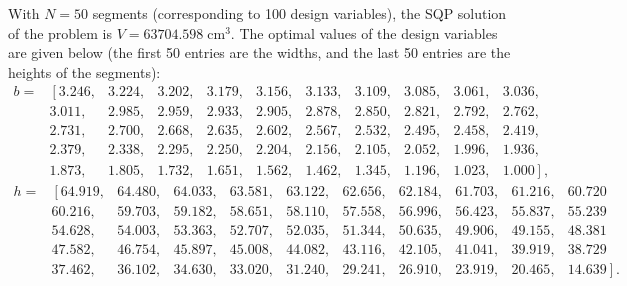 \documentclass[a4paper]{llncs}
\begin{document}
With $N=50$ segments (corresponding to 100 design variables), the SQP solution
of the problem is $V = 63704.598\;\text{cm}^3$. The optimal values of the
design variables are given below (the first 50 entries are the widths, and the
last 50 entries are the heights of the segments):
\setcounter{MaxMatrixCols}{11}
\[
\begin{matrix}%
			b=& \left[3.246, \right.& 3.224,& 3.202,& 3.179,& 3.156,& 3.133,& 3.109,& 3.085,& 3.061,& 3.036,  \\
			  & 3.011,& 2.985,& 2.959,& 2.933,& 2.905,& 2.878,& 2.850,& 2.821,& 2.792,& 2.762, \\
			  & 2.731,& 2.700,& 2.668,& 2.635,& 2.602,& 2.567,& 2.532,& 2.495,& 2.458,& 2.419, \\
			  & 2.379,& 2.338,& 2.295,& 2.250,& 2.204,& 2.156,& 2.105,& 2.052,& 1.996,& 1.936, \\
			  & 1.873,& 1.805,& 1.732,& 1.651,& 1.562,& 1.462,& 1.345,& 1.196,& 1.023,& \left. 1.000\right], 	
\end{matrix}
\]
\[
\begin{matrix}
	h=& \left[64.919,\right.&64.480,&64.033,&63.581,&63.122,&62.656,&62.184,&61.703,&61.216,&60.720  \\
		& 60.216,&59.703,&59.182,&58.651,&58.110,&57.558,&56.996,&56.423,&55.837,&55.239  \\
		& 54.628,&54.003,&53.363,&52.707,&52.035,&51.344,&50.635,&49.906,&49.155,&48.381  \\
		& 47.582,&46.754,&45.897,&45.008,&44.082,&43.116,&42.105,&41.041,&39.919,&38.729  \\
		& 37.462,&36.102,&34.630,&33.020,&31.240,&29.241,&26.910,&23.919,&20.465,&\left.14.639 \right].
\end{matrix}
\]
\end{document}
